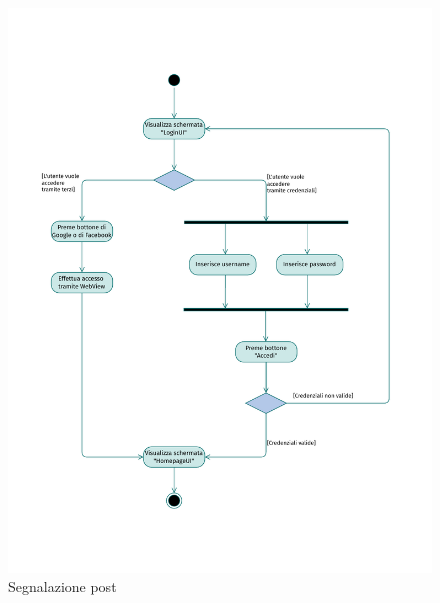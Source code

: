 \documentclass{natourDoc}
\begin{document}
	\newpage
	\begin{figure}[!htbp]
		\centering
		\includegraphics[width=\textwidth, page=15]{./diagrams/activity.pdf}
		\caption{Segnalazione post}
	\end{figure}
	\FloatBarrier

	\newpage
\end{document}
